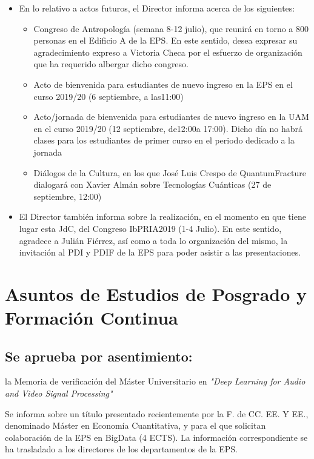 \documentclass[numerado]{plantillasEPS} %
\begin{document}
\begin{itemize}
    \item En lo relativo a actos futuros, el Director informa acerca de los siguientes:
    
    \begin{itemize}
        \item Congreso  de  Antropología  (semana  8-12  julio),  que  reunirá  en  torno  a  800 personas  en  el  Edificio  A  de  la  EPS.  En  este  sentido,  desea  expresar  su agradecimiento  expreso  a  Victoria  Checa  por  el  esfuerzo  de  organización que ha requerido albergar dicho congreso.
        \item Acto de bienvenida para estudiantes de nuevo ingreso en la EPS en el curso 2019/20 (6 septiembre, a las11:00)
        \item Acto/jornada  de  bienvenida  para estudiantes  de  nuevo  ingreso en  la UAM en  el curso 2019/20  (12  septiembre,  de12:00a  17:00).  Dicho  día  no  habrá clases  para  los  estudiantes  de  primer  curso en  el  periodo  dedicado  a  la jornada
        \item Diálogos  de  la  Cultura,  en  los que  José  Luis  Crespo  de  QuantumFracture dialogará con Xavier Almán sobre Tecnologías Cuánticas (27 de septiembre, 12:00)
    \end{itemize}    
    
    \item El Director también informa sobre la realización, en el momento en que tiene lugar esta JdC, del Congreso IbPRIA2019 (1-4 Julio). En este sentido, agradece a Julián Fiérrez, así como a toda lo organización del mismo, la invitación al PDI y PDIF de la EPS para poder asistir a las presentaciones.
\end{itemize}

\section{Asuntos de Estudios de Posgrado y Formación Continua} 
\subsection{Se  aprueba  por  asentimiento:}  la  Memoria  de  verificación  del  Máster  Universitario  en \textit{"Deep Learning for Audio and Video Signal Processing"}

Se  informa  sobre  un  título  presentado  recientemente  por  la  F.  de  CC.  EE.  Y  EE., denominado Máster en Economía Cuantitativa, y para el que solicitan colaboración de la EPS  en  BigData  (4  ECTS).  La  información  correspondiente  se  ha  trasladado  a  los directores de los departamentos de la EPS.
\end{document}
